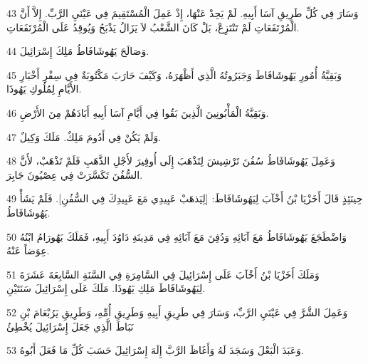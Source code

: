 \par 43 وَسَارَ فِي كُلِّ طَرِيقِ آسَا أَبِيهِ. لَمْ يَحِدْ عَنْهَا، إِذْ عَمِلَ الْمُسْتَقِيمَ فِي عَيْنَيِ الرَّبِّ. إِلاَّ أَنَّ الْمُرْتَفَعَاتِ لَمْ تَنْتَزِعْ، بَلْ كَانَ الشَّعْبُ لاَ يَزَالُ يَذْبَحُ وَيُوقِدُ عَلَى الْمُرْتَفَعَاتِ.
\par 44 وَصَالَحَ يَهُوشَافَاطُ مَلِكَ إِسْرَائِيلَ.
\par 45 وَبَقِيَّةُ أُمُورِ يَهُوشَافَاطَ وَجَبَرُوتُهُ الَّذِي أَظْهَرَهُ، وَكَيْفَ حَارَبَ مَكْتُوبَةٌ فِي سِفْرِ أَخْبَارِ الأَيَّامِ لِمُلُوكِ يَهُوذَا.
\par 46 وَبَقِيَّةُ الْمَأْبُونِينَ الَّذِينَ بَقُوا فِي أَيَّامِ آسَا أَبِيهِ أَبَادَهُمْ مِنَ الأَرْضِ.
\par 47 وَلَمْ يَكُنْ فِي أَدُومَ مَلِكٌ. مَلَكَ وَكِيلٌ.
\par 48 وَعَمِلَ يَهُوشَافَاطُ سُفُنَ تَرْشِيشَ لِتَذْهَبَ إِلَى أُوفِيرَ لأَجْلِ الذَّهَبِ فَلَمْ تَذْهَبْ، لأَنَّ السُّفُنَ تَكَسَّرَتْ فِي عِصْيُونَ جَابِرَ.
\par 49 حِينَئِذٍ قَالَ أَخَزْيَا بْنُ أَخْآبَ لِيَهُوشَافَاطَ: [لِيَذهَبْ عَبِيدِي مَعَ عَبِيدِكَ فِي السُّفُنِ]. فَلَمْ يَشَأْ يَهُوشَافَاطُ.
\par 50 وَاضْطَجَعَ يَهُوشَافَاطُ مَعَ آبَائِهِ وَدُفِنَ مَعَ آبَائِهِ فِي مَدِينَةِ دَاوُدَ أَبِيهِ، فَمَلَكَ يَهُورَامُ ابْنُهُ عِوَضاً عَنْهُ.
\par 51 وَمَلَكَ أَخَزْيَا بْنُ أَخْآبَ عَلَى إِسْرَائِيلَ فِي السَّامِرَةِ فِي السَّنَةِ السَّابِعَةَ عَشَرَةَ لِيَهُوشَافَاطَ مَلِكِ يَهُوذَا. مَلَكَ عَلَى إِسْرَائِيلَ سَنَتَيْنِ.
\par 52 وَعَمِلَ الشَّرَّ فِي عَيْنَيِ الرَّبِّ، وَسَارَ فِي طَرِيقِ أَبِيهِ وَطَرِيقِ أُمِّهِ، وَطَرِيقِ يَرُبْعَامَ بْنِ نَبَاطَ الَّذِي جَعَلَ إِسْرَائِيلَ يُخْطِئُ
\par 53 وَعَبَدَ الْبَعْلَ وَسَجَدَ لَهُ وَأَغَاظَ الرَّبَّ إِلَهَ إِسْرَائِيلَ حَسَبَ كُلِّ مَا فَعَلَ أَبُوهُ.


